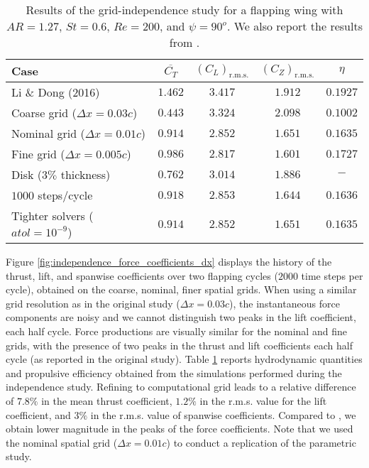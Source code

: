 \begin{table}
  \centering
  \begin{tabular}{lcccc}
    \hline\hline
    Case & $\overline{C_T}$ & $\left( C_L \right)_\text{r.m.s.}$ & $\left( C_Z \right)_\text{r.m.s.}$ & $\eta$ \\
    \hline
    Li \& Dong (2016) & $1.462$ & $3.417$ & $1.912$ & $0.1927$ \\
    Coarse grid ($\Delta x = 0.03c$) & $0.443$ & $3.324$ & $2.098$ & $0.1002$ \\
    Nominal grid ($\Delta x = 0.01c$) & $0.914$ & $2.852$ & $1.651$ & $0.1635$ \\
    Fine grid ($\Delta x = 0.005c$) & $0.986$ & $2.817$ & $1.601$ & $0.1727$ \\
    Disk ($3\%$ thickness) & $0.762$ & $3.014$ & $1.886$ & $-$ \\
    $1000$ steps/cycle & $0.918$ & $2.853$ & $1.644$ & $0.1636$ \\
    Tighter solvers ($atol = 10^{-9}$) & $0.914$ & $2.852$ & $1.651$ & $0.1635$ \\
    \hline\hline
  \end{tabular}
  \caption{Results of the grid-independence study for a flapping wing with $AR = 1.27$, $St = 0.6$, $Re = 200$, and $\psi = 90^o$. We also report the results from \citet{li_dong_2016}.}
  \label{tab:independence_results}
\end{table}

Figure \ref{fig:independence_force_coefficients_dx} displays the history of the thrust, lift, and spanwise coefficients over two flapping cycles ($2000$ time steps per cycle), obtained on the coarse, nominal, finer spatial grids.
When using a similar grid resolution as in the original study ($\Delta x = 0.03c$), the instantaneous force components are noisy and we cannot distinguish two peaks in the lift coefficient, each half cycle.
Force productions are visually similar for the nominal and fine grids, with the presence of two peaks in the thrust and lift coefficients each half cycle (as reported in the original study).
Table \ref{tab:independence_results} reports hydrodynamic quantities and propulsive efficiency obtained from the simulations performed during the independence study.
Refining to computational grid leads to a relative difference of $7.8\%$ in the mean thrust coefficient, $1.2\%$ in the r.m.s. value for the lift coefficient, and $3\%$ in the r.m.s. value of spanwise coefficients.
Compared to \citet{li_dong_2016}, we obtain lower magnitude in the peaks of the force coefficients.
Note that we used the nominal spatial grid ($\Delta x = 0.01c$) to conduct a replication of the parametric study.

